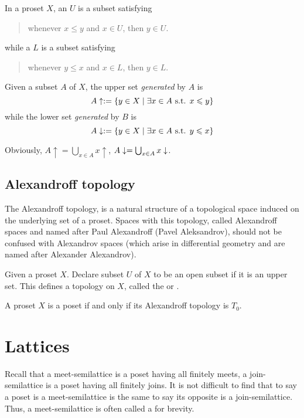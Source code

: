  \begin{defn}
    In a proset $X$, an  $U$ is a subset satisfying
    \begin{quote}
      whenever $x\leqslant y$ and $x\in U$, then $y\in U$.
    \end{quote}
    while a  $L$ is a subset satisfying
    \begin{quote}
      whenever $y\leqslant x$ and $x\in L$, then $y\in L$.
    \end{quote}
    
    Given a subset $A$ of $X$, the upper set \emph{generated} by $A$ is
    \begin{equation*}
      A\uparrow:=\{y\in X\mid \exists x\in A \textrm{ s.t. } x\leqslant y\}
    \end{equation*}
    while the lower set \emph{generated} by $B$ is
    \begin{equation*}
      A\downarrow:=\{y\in X\mid \exists x\in A \textrm{ s.t. } y\leqslant x\}
    \end{equation*}
  \end{defn}
  Obviously, $A\uparrow=\bigcup_{x\in A}x\uparrow$, $A\downarrow=\bigcup_{x\in A}x\downarrow$.

\subsection{Alexandroff topology}
  The Alexandroff topology, is a natural structure of a topological space induced on the underlying set of a proset. Spaces with this topology, called Alexandroff spaces and named after Paul Alexandroff (Pavel Aleksandrov), should not be confused with Alexandrov spaces (which arise in differential geometry and are named after Alexander Alexandrov).
  \begin{defn}
    Given a proset $X$. Declare subset $U$ of $X$ to be an open subset if it is an upper set. This defines a topology on $X$, called the  or .
  \end{defn}
  \begin{prop}
    A proset $X$ is a poset if and only if its Alexandroff topology is $T_0$.
  \end{prop}


\newpage\section{Lattices}
  Recall that a meet-semilattice is a poset having all finitely meets, a join-semilattice is a poset having all finitely joins.
  It is not difficult to find that to say a poset is a meet-semilattice is the same to say its opposite is a join-semilattice.
  Thus, a meet-semilattice is often called a  for brevity.


